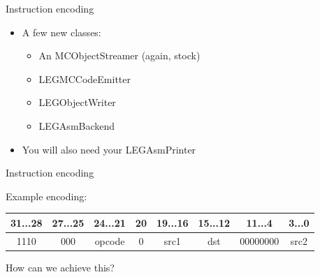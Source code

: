 \begin{frame}{Instruction encoding}

\begin{itemize}
    \item A few new classes:
    \begin{itemize}
        \item An MCObjectStreamer (again, stock)
        \item LEGMCCodeEmitter
        \item LEGObjectWriter
        \item LEGAsmBackend
    \end{itemize}
    \item You will also need your LEGAsmPrinter
\end{itemize}

\end{frame}


\begin{frame}[fragile]{Instruction encoding}

Example encoding:

\vspace{1ex}

\begin{tabular}{|c|c|c|c|c|c|c|c|}
\hline 
31...28 & 27...25 & 24...21 & 20 & 19...16 & 15...12 & 11...4 & 3...0\tabularnewline
\hline 
1110 & 000 & opcode & 0 & src1 & dst & 00000000 & src2\tabularnewline
\hline 
\end{tabular}

\vspace{2ex}

How can we achieve this?

\vspace{1ex}


\end{frame}


